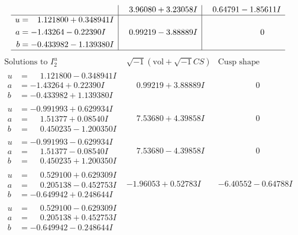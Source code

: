 \documentclass[1p]{elsarticle_modified}
\theoremstyle{definition}
\newcommand{\I}{\sqrt{-1}}
\begin{document}
$$\begin{array}{c|c|c}
 & \phantom{-}3.96080 + 3.23058 I & \phantom{-}0.64791 - 1.85611 I \\ \hline\begin{aligned}
u &= \phantom{-}1.121800 + 0.348941 I \\
a &= -1.43264 - 0.22390 I \\
b &= -0.433982 - 1.139380 I\end{aligned}
 & \phantom{-}0.99219 - 3.88889 I & \phantom{-0.000000 } 0\\
 \hline 
 \end{array}$$\newpage$$\begin{array}{c|c|c}  
\text{Solutions to }I^u_{2}& \I (\text{vol} + \sqrt{-1}CS) & \text{Cusp shape}\\
 \hline 
\begin{aligned}
u &= \phantom{-}1.121800 - 0.348941 I \\
a &= -1.43264 + 0.22390 I \\
b &= -0.433982 + 1.139380 I\end{aligned}
 & \phantom{-}0.99219 + 3.88889 I & \phantom{-0.000000 } 0 \\ \hline\begin{aligned}
u &= -0.991993 + 0.629934 I \\
a &= \phantom{-}1.51377 + 0.08540 I \\
b &= \phantom{-}0.450235 - 1.200350 I\end{aligned}
 & \phantom{-}7.53680 + 4.39858 I & \phantom{-0.000000 } 0 \\ \hline\begin{aligned}
u &= -0.991993 - 0.629934 I \\
a &= \phantom{-}1.51377 - 0.08540 I \\
b &= \phantom{-}0.450235 + 1.200350 I\end{aligned}
 & \phantom{-}7.53680 - 4.39858 I & \phantom{-0.000000 } 0 \\ \hline\begin{aligned}
u &= \phantom{-}0.529100 + 0.629309 I \\
a &= \phantom{-}0.205138 - 0.452753 I \\
b &= -0.649942 + 0.248644 I\end{aligned}
 & -1.96053 + 0.52783 I & -6.40552 - 0.64788 I \\ \hline\begin{aligned}
u &= \phantom{-}0.529100 - 0.629309 I \\
a &= \phantom{-}0.205138 + 0.452753 I \\
b &= -0.649942 - 0.248644 I\end{aligned}

\end{array}$$
\end{document}
